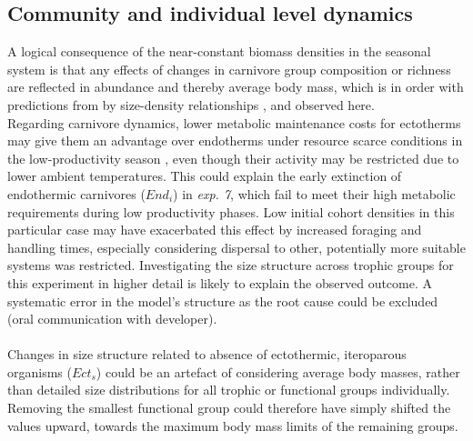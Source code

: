 \subsection{Community and individual level dynamics}
A logical consequence of the near-constant biomass densities in the seasonal system is that any effects of changes in carnivore group composition or richness are reflected in abundance and thereby average body mass, which is in order with predictions from by size-density relationships \citep[cf.][]{White2007}, and observed here. \\
Regarding carnivore dynamics, lower metabolic maintenance costs for ectotherms may give them an advantage over endotherms under resource scarce conditions in the low-productivity season \citep{Shine2005}, even though their activity may be restricted due to lower ambient temperatures. 
This could explain the early extinction of endothermic carnivores ($End_i$) in \textit{exp. 7}, which fail to meet their high metabolic requirements during low productivity phases. Low initial cohort densities in this particular case may have exacerbated this effect by increased foraging and handling times, especially considering dispersal to other, potentially more suitable systems was restricted.
 Investigating the size structure across trophic groups for this experiment in higher detail is likely to explain the observed outcome. A systematic error in the model's structure as the root cause could be excluded (oral communication with developer).
\\\\
Changes in size structure related to absence of ectothermic, iteroparous organisms ($Ect_s$) could be an artefact of considering average body masses, rather than detailed size distributions for all trophic or functional groups individually. Removing the smallest functional group could therefore have simply shifted the values upward, towards the maximum body mass limits of the remaining groups.
%
%


